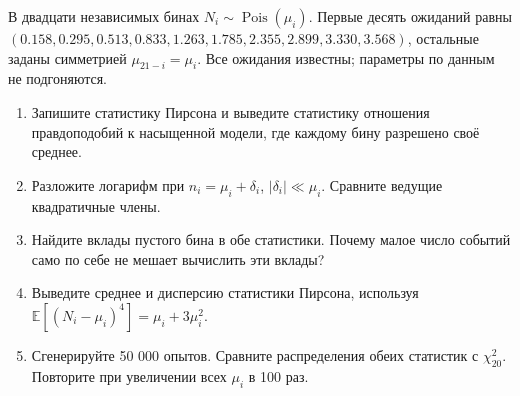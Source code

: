 \documentclass[
  russian,
  11pt,
  a4paper,
  open=any]{scrbook}
\providecommand{\tightlist}{%
  \setlength{\itemsep}{0pt}\setlength{\parskip}{0pt}}
\begin{document}
\begin{semanticpdfbox}[colback=BookCoralSoft,borderline west={1.2mm}{0pt}{BookCoral}]

\par\nopagebreak[4]\vspace{1.2mm}

В двадцати независимых бинах \(N_i\sim\operatorname{Pois}(\mu_i)\).
Первые десять ожиданий равны
\((0.158,0.295,0.513,0.833,1.263,1.785,2.355,2.899,3.330,3.568)\),
остальные заданы симметрией \(\mu_{21-i}=\mu_i\). Все ожидания известны;
параметры по данным не подгоняются.

\begin{enumerate}
\def\labelenumi{\arabic{enumi}.}
\tightlist
\item
  Запишите статистику Пирсона и выведите статистику отношения
  правдоподобий к насыщенной модели, где каждому бину разрешено своё
  среднее.
\item
  Разложите логарифм при \(n_i=\mu_i+\delta_i\), \(|\delta_i|\ll\mu_i\).
  Сравните ведущие квадратичные члены.
\item
  Найдите вклады пустого бина в обе статистики. Почему малое число
  событий само по себе не мешает вычислить эти вклады?
\item
  Выведите среднее и дисперсию статистики Пирсона, используя
  \(\mathbb E[(N_i-\mu_i)^4]=\mu_i+3\mu_i^2\).
\item
  Сгенерируйте 50 000 опытов. Сравните распределения обеих статистик с
  \(\chi^2_{20}\). Повторите при увеличении всех \(\mu_i\) в 100 раз.
\end{enumerate}

\end{semanticpdfbox}
\end{document}
